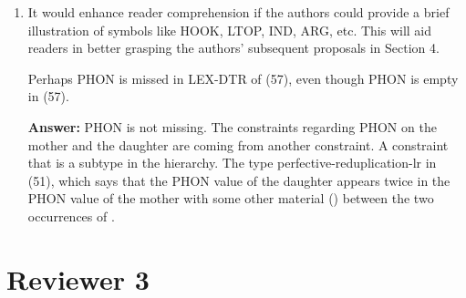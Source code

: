 \documentclass[fleqn,twoside]{article}
\begin{document}
\begin{enumerate}
\item
It would enhance reader comprehension if the authors could provide a brief illustration of symbols
like HOOK, LTOP, IND, ARG, etc. This will aid readers in better grasping the authors' subsequent
proposals in Section 4.


Perhaps PHON is missed in LEX-DTR of (57), even though PHON is empty in (57).

\noindent
\textbf{Answer:} PHON is not missing. The constraints regarding PHON on the mother and the daughter are coming from
another constraint. A constraint that is a subtype in the hierarchy. The type
perfective-reduplication-lr in (51), which says that the PHON value of the daughter  appears
twice in the PHON value of the mother with some other material (\etag) between the two occurrences of .

\end{enumerate}

\section{Reviewer 3}
\end{document}

